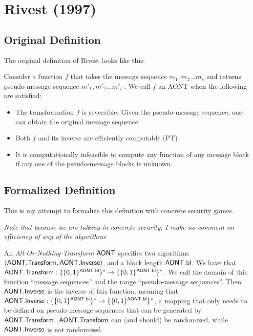 \documentclass[11pt,twoside]{article}
\newcommand{\onlyinsubfile}[1]{#1}
\newcommand{\notinsubfile}[1]{}
\begin{document}
    \renewcommand{\onlyinsubfile}[1]{}
    \renewcommand{\notinsubfile}[1]{#1}
  
\section{Rivest (1997)}

\subsection{Original Definition}

The original definition of Rivest looks like this: 

Consider a function $f$ that takes the message sequence $m_1,m_2\dots m_s$ and returns pseudo-message sequence $m'_1,m'_2\dots m'_{s'}$. We call $f$ an AONT when the following are satisfied: 

\begin{itemize}

\item The transformation $f$ is reversible: Given the pseudo-message sequence, one can obtain the original message sequence. 
\item Both $f$ and its inverse are efficiently computable (PT) 
\item It is computationally infeasible to compute any function of any message block if any one of the pseudo-message blocks is unknown. 

\end{itemize} 

\subsection{Formalized Definition}

This is my attempt to formalize this definition with concrete security games. 

\emph{Note that because we are talking in concrete security, I make no comment on efficiency of any of the algorithms} 

An \emph{All-Or-Nothing-Transform} $\mathsf{AONT}$ specifies two algorithms $(\mathsf{AONT.Transform}, \mathsf{AONT.Inverse})$, and a block length $\mathsf{AONT.bl}$. We have that $\mathsf{AONT.Transform}: \{ \{0,1\}^{\mathsf{AONT.bl}}\}^*\rightarrow \{ \{0,1\}^{\mathsf{AONT.bl}}\}^*$. We call the domain of this function ``message sequences'' and the range ``pseudo-message sequences''. Then $\mathsf{AONT.Inverse}$ is the inverse of this function, meaning that $\mathsf{AONT.Inverse}: \{ \{0,1\}^{\mathsf{AONT.bl}}\}^*\rightarrow \{ \{0,1\}^{\mathsf{AONT.bl}}\}^*$, a mapping that only needs to be defined on pseudo-message sequences that can be generated by $\mathsf{AONT.Transform}$. $\mathsf{AONT.Transform}$ can (and should) be randomized, while $\mathsf{AONT.Inverse}$ is not randomized.
\end{document}
